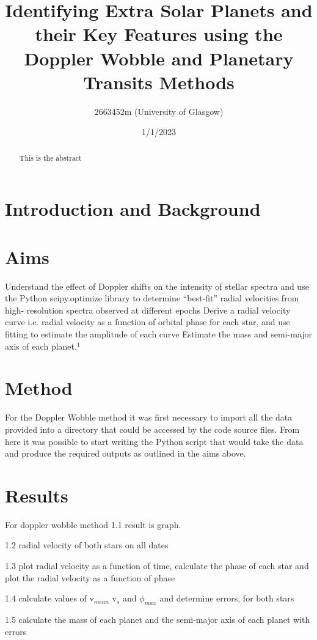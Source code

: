 \documentclass[]{article}
\title{\textbf{Identifying Extra Solar Planets and their Key Features using the Doppler Wobble and Planetary Transits Methods}}
\author{2663452m (University of Glasgow)}
\date{1/1/2023}
\begin{document}
\maketitle

\begin{abstract}
This is the abstract

\end{abstract}
\newpage



\twocolumn
\section*{Introduction and Background}

\section*{Aims}
Understand the effect of Doppler shifts on the intensity of stellar spectra and use the Python scipy.optimize library to determine “best-fit” radial velocities from high- resolution spectra observed at different epochs
Derive a radial velocity curve i.e. radial velocity as a function of orbital phase for each star, and use fitting to estimate the amplitude of each curve 
Estimate the mass and semi-major axis of each planet.$^1$

\section*{Method}
For the Doppler Wobble method it was first necessary to 
import all the data provided into a directory that could be 
accessed by the code source files. From here it was possible to start
writing the Python script that would take the data and produce the required outputs as outlined in the aims above.




\section*{Results}
For doppler wobble method 1.1 result is graph. \par
1.2 radial velocity of both stars on all dates\par
1.3 plot radial velocity as a function of time, calculate the phase
of each star and plot the radial velocity as a function of phase\par
1.4 calculate values of v$_{mean}$ v$_{s}$ and $\phi_{max}$ and determine errors,
for both stars\par
1.5 calculate the mass of each planet and the semi-major axis of each planet with errors\par
\end{document}

